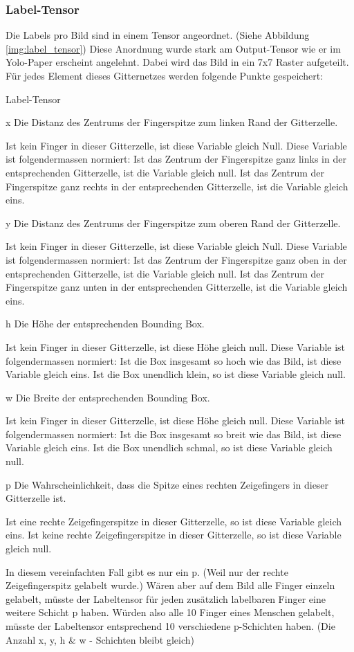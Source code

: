 \subsubsection{Label-Tensor}
Die Labels pro Bild sind in einem Tensor angeordnet. 
(Siehe Abbildung \ref{img:label_tensor})
Diese Anordnung wurde stark am Output-Tensor wie er im Yolo-Paper \cite{yolo} erscheint angelehnt.
Dabei wird das Bild in ein 7x7 Raster aufgeteilt.
Für jedes Element dieses Gitternetzes werden folgende Punkte gespeichert:
\begin{labeling}{Label-Tensor}
\item[x] Die Distanz des Zentrums der Fingerspitze zum linken Rand der Gitterzelle.

Ist kein Finger in dieser Gitterzelle, ist diese Variable gleich Null.
Diese Variable ist folgendermassen normiert: 
Ist das Zentrum der Fingerspitze ganz links in der entsprechenden Gitterzelle, ist die Variable gleich null.
Ist das Zentrum der Fingerspitze ganz rechts in der entsprechenden Gitterzelle, ist die Variable gleich eins.
\item[y] Die Distanz des Zentrums der Fingerspitze zum oberen Rand der Gitterzelle.

Ist kein Finger in dieser Gitterzelle, ist diese Variable gleich Null. 
Diese Variable ist folgendermassen normiert:
Ist das Zentrum der Fingerspitze ganz oben in der entsprechenden Gitterzelle, ist die Variable gleich null.
Ist das Zentrum der Fingerspitze ganz unten in der entsprechenden Gitterzelle, ist die Variable gleich eins.
\item[h] Die Höhe der entsprechenden Bounding Box.

Ist kein Finger in dieser Gitterzelle, ist diese Höhe gleich null.
Diese Variable ist folgendermassen normiert:
Ist die Box insgesamt so hoch wie das Bild, ist diese Variable gleich eins. 
Ist die Box \grqq{}unendlich\grqq{} klein, so ist diese Variable gleich null.
\item[w] Die Breite der entsprechenden Bounding Box.

Ist kein Finger in dieser Gitterzelle, ist diese Höhe gleich null.
Diese Variable ist folgendermassen normiert:
Ist die Box insgesamt so breit wie das Bild, ist diese Variable gleich eins.
Ist die Box \grqq{}unendlich\grqq{} schmal, so ist diese Variable gleich null.
\item[p] Die Wahrscheinlichkeit, dass die Spitze eines rechten Zeigefingers in dieser Gitterzelle ist. 

Ist eine rechte Zeigefingerspitze in dieser Gitterzelle, so ist diese Variable gleich eins.
Ist keine rechte Zeigefingerspitze in dieser Gitterzelle, so ist diese Variable gleich null.

In diesem vereinfachten Fall gibt es nur ein p.
(Weil nur der rechte Zeigefingerspitz gelabelt wurde.)
Wären aber auf dem Bild alle Finger einzeln gelabelt, müsste der Labeltensor für jeden zusätzlich labelbaren Finger eine weitere Schicht p haben. 
Würden also alle 10 Finger eines Menschen gelabelt, müsste der Labeltensor entsprechend 10 verschiedene p-Schichten haben.
(Die Anzahl x, y, h \& w - Schichten bleibt gleich) 
\end{labeling}

